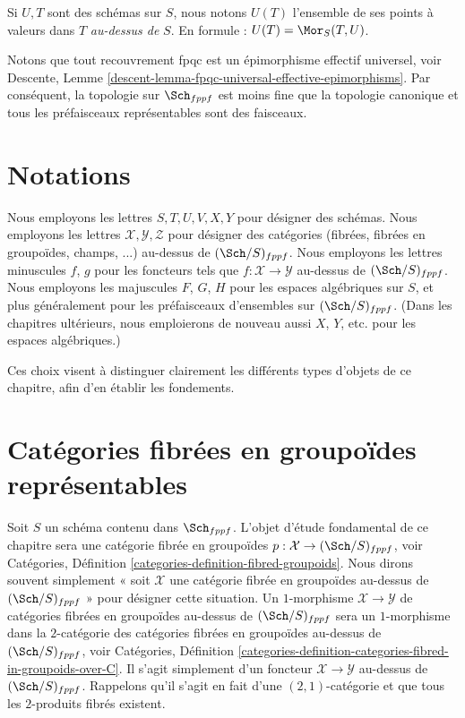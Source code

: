 \medskip\noindent
Si $U, T$ sont des schémas sur $S$, nous notons
$U(T)$ l'ensemble de ses points à valeurs dans $T$ {\it au-dessus de} $S$.
En formule : $U(T) = \Mor_S(T, U)$.

\medskip\noindent
Notons que tout recouvrement fpqc est un épimorphisme effectif
universel, voir
Descente, Lemme \ref{descent-lemma-fpqc-universal-effective-epimorphisms}.
Par conséquent, la topologie sur $\Sch_{fppf}$
est moins fine que la topologie canonique et tous les préfaisceaux représentables
sont des faisceaux.








\section{Notations}
\label{section-notation}

\noindent
Nous employons les lettres $S, T, U, V, X, Y$ pour désigner des schémas.
Nous employons les lettres $\mathcal{X}, \mathcal{Y}, \mathcal{Z}$ pour désigner des
catégories (fibrées, fibrées en groupoïdes, champs, ...)
au-dessus de $(\Sch/S)_{fppf}$. Nous employons les lettres minuscules
$f$, $g$ pour les foncteurs tels que $f : \mathcal{X} \to \mathcal{Y}$
au-dessus de $(\Sch/S)_{fppf}$.
Nous employons les majuscules $F$, $G$, $H$ pour les espaces algébriques sur $S$, et plus
généralement pour les préfaisceaux d'ensembles sur $(\Sch/S)_{fppf}$.
(Dans les chapitres ultérieurs, nous emploierons de nouveau aussi $X$, $Y$, etc.
pour les espaces algébriques.)

\medskip\noindent
Ces choix visent à distinguer clairement les différents
types d'objets de ce chapitre, afin d'en établir les fondements.









\section{Catégories fibrées en groupoïdes représentables}
\label{section-representable}

\noindent
Soit $S$ un schéma contenu dans $\Sch_{fppf}$.
L'objet d'étude fondamental de ce chapitre sera une
catégorie fibrée en groupoïdes
$p : \mathcal{X} \to (\Sch/S)_{fppf}$, voir
Catégories, Définition \ref{categories-definition-fibred-groupoids}.
Nous dirons souvent simplement « soit $\mathcal{X}$ une catégorie fibrée
en groupoïdes au-dessus de $(\Sch/S)_{fppf}$ » pour désigner
cette situation. Un $1$-morphisme $\mathcal{X} \to \mathcal{Y}$ de catégories
fibrées en groupoïdes au-dessus de $(\Sch/S)_{fppf}$ sera un $1$-morphisme
dans la $2$-catégorie des catégories fibrées en groupoïdes au-dessus de
$(\Sch/S)_{fppf}$, voir
Catégories,
Définition \ref{categories-definition-categories-fibred-in-groupoids-over-C}.
Il s'agit simplement d'un foncteur $\mathcal{X} \to \mathcal{Y}$ au-dessus de
$(\Sch/S)_{fppf}$.
Rappelons qu'il s'agit en fait d'une $(2, 1)$-catégorie et que tous les $2$-produits fibrés
existent.

